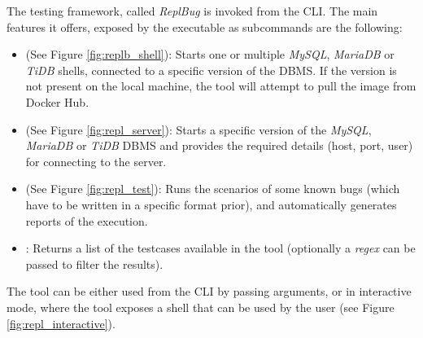 The testing framework, called \textit{ReplBug} is invoked from the CLI. The main features it offers, exposed by the executable as subcommands are the following:
\begin{itemize}
    \item \textbf{} (See Figure \ref{fig:replb_shell}): Starts one or multiple \textit{MySQL}, \textit{MariaDB} or \textit{TiDB} shells, connected to a specific version of the DBMS. If the version is not present on the local machine, the tool will attempt to pull the image from Docker Hub.
    \item \textbf{} (See Figure \ref{fig:repl_server}): Starts a specific version of the \textit{MySQL}, \textit{MariaDB} or \textit{TiDB} DBMS and provides the required details (host, port, user) for connecting to the server.
    \item \textbf{} (See Figure \ref{fig:repl_test}): Runs the scenarios of some known bugs (which have to be written in a specific format prior), and automatically generates reports of the execution.
    \item \textbf{}: Returns a list of the testcases available in the tool (optionally a \textit{regex} can be passed to filter the results).
\end{itemize}

The tool can be either used from the CLI by passing arguments, or in interactive mode, where the tool exposes a shell that can be used by the user  (see Figure \ref{fig:repl_interactive}).



